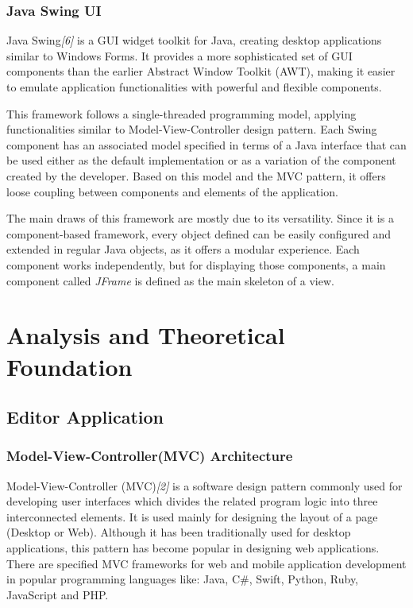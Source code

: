 \documentclass[12pt,a4paper,twoside]{report}
\begin{document}
\subsection{Java Swing UI}

Java Swing{\it[6]} is a GUI widget toolkit for Java, creating desktop applications similar to Windows Forms. It provides a more sophisticated set of GUI components than the earlier Abstract Window Toolkit (AWT), making it easier to emulate application functionalities with powerful and flexible components. 

This framework follows a single-threaded programming model, applying functionalities similar to Model-View-Controller design pattern. Each Swing component has an associated model specified in terms of a Java interface that can be used either as the default implementation or as a variation of the component created by the developer. Based on this model and the MVC pattern, it offers loose coupling between components and elements of the application.

The main draws of this framework are mostly due to its versatility. Since it is a component-based framework, every object defined can be easily configured and extended in regular Java objects, as it offers a modular experience. Each component works independently, but for displaying those components, a main component called \textit{JFrame} is defined as the main skeleton of a view. 



\chapter{Analysis and Theoretical Foundation}
\section{Editor Application}
\subsection{Model-View-Controller(MVC) Architecture}

Model-View-Controller (MVC)\textit{[2]} is a software design pattern commonly used for developing user interfaces which divides the related program logic into three interconnected elements. It is used mainly for designing the layout of a page (Desktop or Web). Although it has been traditionally used for desktop applications, this pattern has become popular in designing web applications. There are specified MVC frameworks for web and mobile application development in popular programming languages like: Java, C\#, Swift, Python, Ruby, JavaScript and PHP.
\end{document}
